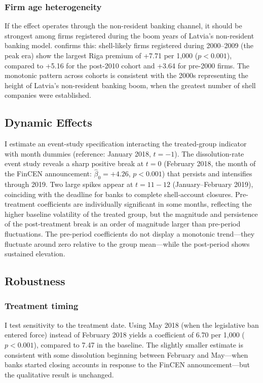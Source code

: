 \documentclass[12pt]{article}
\begin{document}


\subsubsection*{Firm age heterogeneity} If the effect operates through the non-resident banking channel, it should be strongest among firms registered during the boom years of Latvia's non-resident banking model.  confirms this: shell-likely firms registered during 2000--2009 (the peak era) show the largest Riga premium of +7.71 per 1,000 ($p < 0.001$), compared to +5.16 for the post-2010 cohort and +3.64 for pre-2000 firms. The monotonic pattern across cohorts is consistent with the 2000s representing the height of Latvia's non-resident banking boom, when the greatest number of shell companies were established.



\subsection{Dynamic Effects}

I estimate an event-study specification interacting the treated-group indicator with month dummies (reference: January 2018, $t = -1$). The dissolution-rate event study reveals a sharp positive break at $t = 0$ (February 2018, the month of the FinCEN announcement: $\hat{\beta}_0 = +4.26$, $p < 0.001$) that persists and intensifies through 2019. Two large spikes appear at $t = 11{-}12$ (January--February 2019), coinciding with the deadline for banks to complete shell-account closures. Pre-treatment coefficients are individually significant in some months, reflecting the higher baseline volatility of the treated group, but the magnitude and persistence of the post-treatment break is an order of magnitude larger than pre-period fluctuations. The pre-period coefficients do not display a monotonic trend---they fluctuate around zero relative to the group mean---while the post-period shows sustained elevation.

\subsection{Robustness}

\subsubsection*{Treatment timing} I test sensitivity to the treatment date. Using May 2018 (when the legislative ban entered force) instead of February 2018 yields a coefficient of 6.70 per 1,000 ($p < 0.001$), compared to 7.47 in the baseline. The slightly smaller estimate is consistent with some dissolution beginning between February and May---when banks started closing accounts in response to the FinCEN announcement---but the qualitative result is unchanged.
\end{document}
